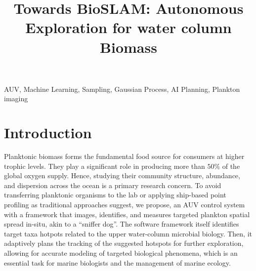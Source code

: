 \documentclass[conference]{IEEEtran}
\begin{document}
\title{Towards BioSLAM: Autonomous Exploration for water column Biomass\\
}

\author{
}
\maketitle



\begin{IEEEkeywords}
AUV, Machine Learning, Sampling, Gaussian Process, AI Planning, Plankton imaging
\end{IEEEkeywords}

\section{Introduction}

Planktonic biomass forms the fundamental food source for consumers at
higher trophic levels. They play a significant role in producing more
than $50\%$ of the global oxygen supply. Hence, studying their
community structure, abundance, and dispersion across the ocean is a
primary research concern. To avoid transferring planktonic organisms
to the lab or applying ship-based point profiling as traditional
approaches suggest, we propose, an AUV control system with a framework
that images, identifies, and measures targeted plankton spatial spread
in-situ, akin to a ``sniffer dog''.  The software framework itself
identifies target taxa hotpots related to the upper water-column
microbial biology. Then, it adaptively plans the tracking of the
suggested hotspots for further exploration, allowing for accurate
modeling of targeted biological phenomena, which is an essential task
for marine biologists and the management of marine ecology.
\end{document}

